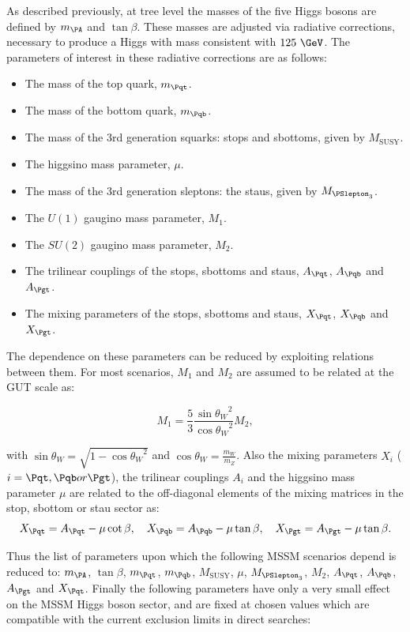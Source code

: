 As described previously, at tree level the masses of the five Higgs bosons are
defined by $m_{\PA}$ and $\tan\beta$. These masses are adjusted via radiative
corrections, necessary to produce a Higgs with mass consistent with $125~\GeV$.
The parameters of interest in these radiative corrections are as follows:

\begin{itemize}
\item The mass of the top quark, $m_{\Pqt}$.
\item The mass of the bottom quark, $m_{\Pqb}$.
\item The mass of the 3rd generation squarks: stops and sbottoms, given by
$M_{\text{SUSY}}$.
\item The higgsino mass parameter, $\mu$.
\item The mass of the 3rd generation sleptons: the staus, given by
$M_{\PSlepton_{3}}$.
\item The $U(1)$ gaugino mass parameter, $M_{1}$.
\item The $SU(2)$ gaugino mass parameter, $M_{2}$.
\item The trilinear couplings of the stops, sbottoms and staus, $A_{\Pqt}$,
$A_{\Pqb}$ and $A_{\Pgt}$.
\item The mixing parameters of the stops, sbottoms and staus, $X_{\Pqt}$,
$X_{\Pqb}$ and $X_{\Pgt}$.
\end{itemize}

The dependence on these parameters can be reduced by exploiting relations
between them. For most scenarios, $M_{1}$ and $M_{2}$ are assumed to be related
at the GUT scale as:

\begin{equation}
M_{1} = \frac{5}{3}\frac{{\sin{\theta_{W}}}^{2}}{{\cos{\theta_{W}}}^{2}} M_{2},
\label{eq:GUTrelation}
\end{equation}

with $\sin{\theta_{W}} = \sqrt{1-{\cos{\theta_{W}}}^{2}}$ and 
$\cos{\theta_{W} = \frac{m_{W}}{m_{Z}}}$. Also
the mixing parameters $X_{i}$ ($i=\Pqt,\Pqb or
\Pgt$), the trilinear couplings $A_{i}$ and the higgsino mass parameter $\mu$ 
are related to the off-diagonal elements of the mixing matrices in the
stop, sbottom or stau sector as:
\begin{equation}
X_{\Pqt} = A_{\Pqt} -\mu\cot\beta, \quad X_{\Pqb} = A_{\Pqb} -\mu\tan\beta,
\quad X_{\Pgt} = A_{\Pgt} -\mu\tan\beta .
\end{equation}

Thus the list of parameters upon which the following MSSM scenarios depend is
reduced to: $m_{\PA}$, $\tan\beta$, $m_{\Pqt}$, $m_{\Pqb}$, $M_{\text{SUSY}}$,
$\mu$, $M_{\PSlepton_{3}}$, $M_{2}$, $A_{\Pqt}$, $A_{\Pqb}$, $A_{\Pgt}$ and
$X_{\Pqt}$. Finally the following parameters have only a very small effect on
the MSSM Higgs boson sector, and are fixed at chosen values which are compatible
with the current exclusion limits in direct searches:

